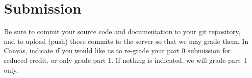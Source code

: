 \documentclass{article}
\begin{document}
\section{Submission}

Be sure to commit your source code and documentation to your
git repository, and to upload (push) those commits to the server
so that we may grade them.
In Canvas,
indicate if you would like us to re-grade your part 0 submission
for reduced credit, or only grade part 1.
If nothing is indicated, we will grade part~1 only.
\end{document}
